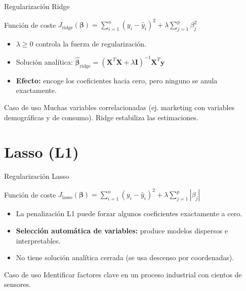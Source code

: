 \documentclass[aspectratio=169, 10pt, xcolor=table]{beamer}
\begin{document}
\begin{frame}{Regularización Ridge}
    \begin{block}{Función de coste}
        $\displaystyle J_{\text{ridge}}(\boldsymbol{\beta}) = \sum_{i=1}^n (y_i - \hat{y}_i)^2 + \lambda \sum_{j=1}^p \beta_j^2$
    \end{block}
    \begin{itemize}
        \item $\lambda \ge 0$ controla la fuerza de regularización.
        \item Solución analítica: $\hat{\boldsymbol{\beta}}_{\text{ridge}} = (\mathbf{X}^T\mathbf{X} + \lambda\mathbf{I})^{-1}\mathbf{X}^T\mathbf{y}$
        \item \textbf{Efecto:} encoge los coeficientes hacia cero, pero ninguno se anula exactamente.
    \end{itemize}
    \begin{exampleblock}{Caso de uso}
        Muchas variables correlacionadas (ej. marketing con variables demográficas y de consumo). Ridge estabiliza las estimaciones.
    \end{exampleblock}
\end{frame}

\section{Lasso (L1)}

\begin{frame}{Regularización Lasso}
    \begin{block}{Función de coste}
        $\displaystyle J_{\text{lasso}}(\boldsymbol{\beta}) = \sum_{i=1}^n (y_i - \hat{y}_i)^2 + \lambda \sum_{j=1}^p |\beta_j|$
    \end{block}
    \begin{itemize}
        \item La penalización L1 puede forzar algunos coeficientes exactamente a cero.
        \item \textbf{Selección automática de variables:} produce modelos dispersos e interpretables.
        \item No tiene solución analítica cerrada (se usa descenso por coordenadas).
    \end{itemize}
    \begin{exampleblock}{Caso de uso}
        Identificar factores clave en un proceso industrial con cientos de sensores.
    \end{exampleblock}
\end{frame}
\end{document}
